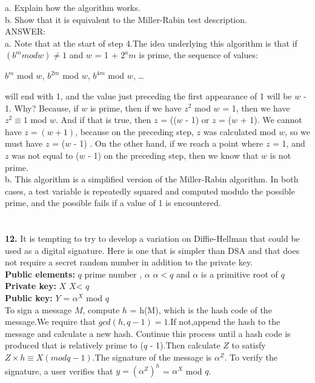 \documentclass[paper=a4, fontsize=11pt]{scrartcl} %
\numberwithin{equation}{section} %
\numberwithin{figure}{section} %
\numberwithin{table}{section} %
\begin{document}
a.  Explain how the algorithm works.\\
b.  Show that it is equivalent to the Miller-Rabin test description.\\

ANSWER:\\
a.  Note that at the start of  step 4.The idea underlying this algorithm is that if $(b^{m} mod w) \neq 1$ and $w$ = 1 + $2^{a}m$ is prime, the sequence of values:\\
\centerline{$b^{m}$ mod $w$, $b^{2m}$ mod $w$, $b^{4m}$ mod $w$, \ldots}
will end with 1, and the value just preceding the first appearance of 1 will be $w$ - 1. Why? Because, if $w$ is prime, then if we have $z^{2}$ mod $w$ = 1, then we have $z^{2} \equiv 1$ mod $w$. And if that is true, then $z$ = (($w$ - 1) or $z$ = ($w$ + 1). We cannot have $z = (w + 1)$, because on the preceding step, $z$ was calculated mod $w$, so we must have $z$ = ($w$ - 1) . On the other hand, if we reach a point where $z$ = 1, and $z$ was not equal to ($w$ - 1)  on the preceding step, then we know that $w$ is not prime.\\
b.  This algorithm is a simplified version of the Miller-Rabin algorithm. In both cases, a test variable is repeatedly squared and computed modulo the possible prime, and the possible fails if a value of 1 is encountered.\\
\\
\\
\textbf{12.} It is tempting to try to develop a variation on Diffie-Hellman that could be used as a digital signature. Here is one that is simpler than DSA and that does not require a secret random number in addition to the private key.\\
\textbf{Public elements:}  $q$    prime number , $\alpha$    $\alpha < q$  and $\alpha$ is a primitive root of $q$ \\
\textbf{Private key:}      $X$    $X$< $q$ \\
\textbf{Public key:}       $Y$ = $\alpha^{X}$ mod $q$\\
To sign a message $M$, compute $h$ = h(M), which is the hash code of the message.We require that $gcd(h, q - 1) = 1$.If not,append the hash to the message and calculate a new hash. Continue this process until a hash code is produced that is relatively prime to ($q$ - 1).Then calculate $Z$ to satisfy $Z \times h \equiv X(mod q - 1)$.The signature of the message is $\alpha^{Z}$. To verify the signature, a user verifies that $y = (\alpha^{Z})^{h}$ = $\alpha^{X}$ mod $q$.\\
\end{document}
